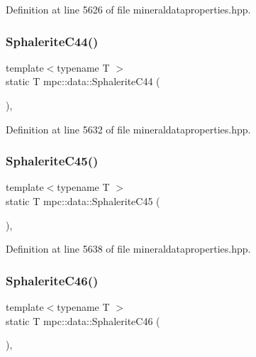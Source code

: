 Definition at line 5626 of file mineraldataproperties.\+hpp.

\mbox{\label{namespacempc_1_1data_a2522db1c1e45aeeaca7239214508b27a}} 
\subsubsection{\texorpdfstring{Sphalerite\+C44()}{SphaleriteC44()}}
{\footnotesize\ttfamily template$<$typename T $>$ \\
static T mpc\+::data\+::\+Sphalerite\+C44 (\begin{DoxyParamCaption}{ }\end{DoxyParamCaption})\hspace{0.3cm}{\ttfamily [inline]}, {\ttfamily [static]}}



Definition at line 5632 of file mineraldataproperties.\+hpp.

\mbox{\label{namespacempc_1_1data_ab97943f217d9ec4c143b4b597faa7f73}} 
\subsubsection{\texorpdfstring{Sphalerite\+C45()}{SphaleriteC45()}}
{\footnotesize\ttfamily template$<$typename T $>$ \\
static T mpc\+::data\+::\+Sphalerite\+C45 (\begin{DoxyParamCaption}{ }\end{DoxyParamCaption})\hspace{0.3cm}{\ttfamily [inline]}, {\ttfamily [static]}}



Definition at line 5638 of file mineraldataproperties.\+hpp.

\mbox{\label{namespacempc_1_1data_a93db77fdf45791fd286daeb5cc22484b}} 
\subsubsection{\texorpdfstring{Sphalerite\+C46()}{SphaleriteC46()}}
{\footnotesize\ttfamily template$<$typename T $>$ \\
static T mpc\+::data\+::\+Sphalerite\+C46 (\begin{DoxyParamCaption}{ }\end{DoxyParamCaption})\hspace{0.3cm}{\ttfamily [inline]}, {\ttfamily [static]}}




